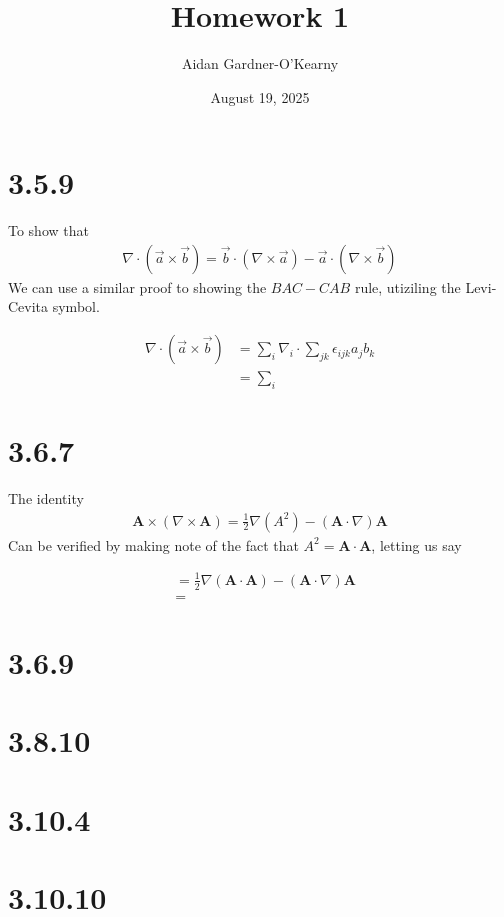 \documentclass{article}
\title{Homework 1}
\author{Aidan Gardner-O'Kearny}
\date{August 19, 2025}
\newcommand{\p}[1]{\left(#1\right)}
\begin{document}
\maketitle
\section*{3.5.9}
To show that
\begin{align*}
    \nabla\cdot\p{\vec{a}\times\vec{b}}=\vec{b}\cdot\p{\nabla\times\vec{a}}-\vec{a}\cdot\p{\nabla\times\vec{b}}
\end{align*}
We can use a similar proof to showing the $BAC-CAB$ rule, utiziling the Levi-Cevita symbol.

\begin{align*}
    \nabla\cdot\p{\vec{a}\times\vec{b}}&=\sum_{i}\nabla_{i}\cdot\sum_{jk}\epsilon_{ijk}a_{j}b_{k}\\[1em]
    &=\sum_{i}
\end{align*}


\section*{3.6.7}
The identity
\begin{align*}
    \boldsymbol{A}\times\p{\nabla\times\boldsymbol{A}}=\frac{1}{2}\nabla\p{A^2}-\p{\boldsymbol{A}\cdot\nabla}\boldsymbol{A}
\end{align*}
Can be verified by making note of the fact that $A^2=\boldsymbol{A}\cdot\boldsymbol{A}$, letting us say

\begin{align*}
    &=\frac{1}{2}\nabla\p{\boldsymbol{A}\cdot\boldsymbol{A}}-\p{\boldsymbol{A}\cdot\nabla}\boldsymbol{A}\\[1em]
    &=
\end{align*}


\section*{3.6.9}




\section*{3.8.10}




\section*{3.10.4}




\section*{3.10.10}
\end{document}
